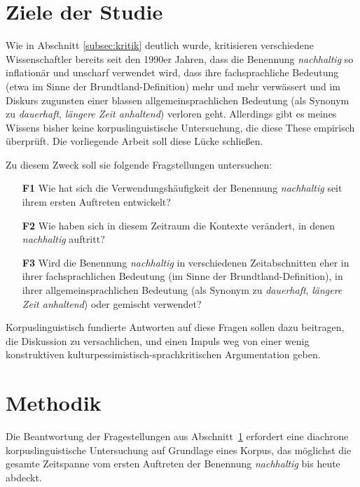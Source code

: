 \documentclass[
    german,
    a4paper,%
    12pt,%
    oneside,%
    toc=bibliography,
    final,
]{scrartcl}
\begin{document}
\section{Ziele der Studie}
\label{sec:ziele}

Wie in Abschnitt \ref{subsec:kritik} deutlich wurde, kritisieren verschiedene Wissenschaftler bereits seit den 1990er Jahren, dass die Benennung \textit{nachhaltig} so inflationär und unscharf verwendet wird, dass ihre fachsprachliche Bedeutung (etwa im Sinne der Brundtland-Definition) mehr und mehr verwässert und im Diskurs zugunsten einer blassen allgemeinsprachlichen Bedeutung (als Synonym zu \textit{dauerhaft}, \textit{längere Zeit anhaltend}) verloren geht. Allerdings gibt es meines Wissens bisher keine korpuslinguistische Untersuchung, die diese These empirisch überprüft. Die vorliegende Arbeit soll diese Lücke schließen.

Zu diesem Zweck soll sie folgende Fragstellungen untersuchen:

\begin{enumerate}[rightmargin=1cm]
\item[\textbf{F1}] Wie hat sich die Verwendungshäufigkeit der Benennung \textit{nachhaltig} seit ihrem ersten Auftreten entwickelt?
\item[\textbf{F2}] Wie haben sich in diesem Zeitraum die Kontexte verändert, in denen \textit{nachhaltig} auftritt?
\item[\textbf{F3}] Wird die Benennung \textit{nachhaltig} in verschiedenen Zeitabschnitten eher in ihrer fachsprachlichen Bedeutung (im Sinne der Brundtland-Definition), in ihrer allgemeinsprachlichen Bedeutung (als Synonym zu \textit{dauerhaft}, \textit{längere Zeit anhaltend}) oder gemischt verwendet?
\end{enumerate}

Korpuslinguistisch fundierte Antworten auf diese Fragen sollen dazu beitragen, die Diskussion zu versachlichen, und einen Impuls weg von einer wenig konstruktiven kulturpessimistisch-sprachkritischen Argumentation geben.

\section{Methodik}
\label{sec:methodik}

Die Beantwortung der Fragestellungen aus Abschnitt~\ref{sec:ziele} erfordert eine diachrone korpuslinguistische Untersuchung auf Grundlage eines Korpus, das möglichst die gesamte Zeitspanne vom ersten Auftreten der Benennung \textit{nachhaltig} bis heute abdeckt.
\end{document}
